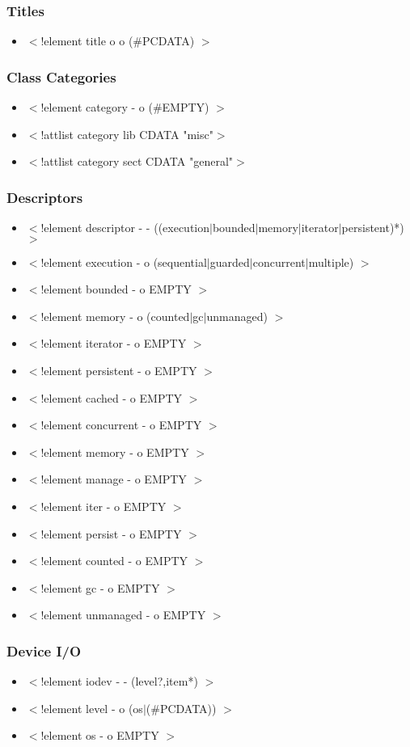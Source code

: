 \subsubsection{Titles}
\begin{itemize}
\item
$<$!element title o o (\#PCDATA) $>$
\end{itemize}
\subsubsection{Class Categories}
\begin{itemize}
\item
$<$!element category - o (\#EMPTY) $>$
\item
$<$!attlist category lib CDATA "misc"$>$
\item
$<$!attlist category sect CDATA "general"$>$
\end{itemize}
\subsubsection{Descriptors}
\begin{itemize}
\item
$<$!element descriptor - - ((execution$|$bounded$|$memory$|$iterator$|$persistent)*) $>$
\item
$<$!element execution - o (sequential$|$guarded$|$concurrent$|$multiple) $>$
\item
$<$!element bounded - o EMPTY $>$
\item
$<$!element memory - o (counted$|$gc$|$unmanaged) $>$
\item
$<$!element iterator - o EMPTY $>$
\item
$<$!element persistent - o EMPTY $>$
\item
$<$!element cached - o EMPTY $>$
\item
$<$!element concurrent - o EMPTY $>$
\item
$<$!element memory - o EMPTY $>$
\item
$<$!element manage - o EMPTY $>$
\item
$<$!element iter - o EMPTY $>$
\item
$<$!element persist - o EMPTY $>$
\item
$<$!element counted - o EMPTY $>$
\item
$<$!element gc - o EMPTY $>$
\item
$<$!element unmanaged - o EMPTY $>$
\end{itemize}
\subsubsection{Device I/O}
\begin{itemize}
\item
$<$!element iodev - - (level?,item*) $>$
\item
$<$!element level - o (os$|$(\#PCDATA)) $>$
\item
$<$!element os - o EMPTY $>$
\end{itemize}
